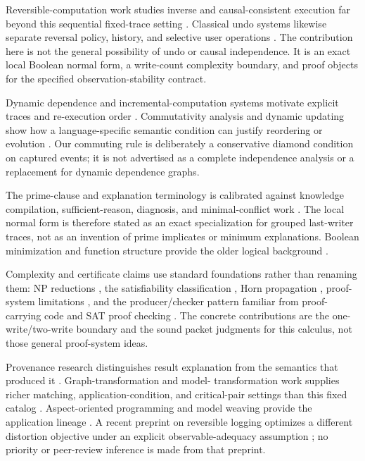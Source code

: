 Reversible-computation work studies inverse and causal-consistent execution far
beyond this sequential fixed-trace setting \cite{Lanese2024,Ulidowski2018,Danos2004,
Phillips2007,Abramsky2005,Landauer1961,Bennett1973}.  Classical undo systems likewise
separate reversal policy, history, and selective user operations
\cite{Archer1984,Leeman1986,Berlage1994,Prakash1994,Abowd1992}.  The contribution here
is not the general possibility of undo or causal independence.  It is an exact local
Boolean normal form, a write-count complexity boundary, and proof objects for the
specified observation-stability contract.

Dynamic dependence and incremental-computation systems motivate explicit traces and
re-execution order \cite{Acar2006,Acar2010,Liu1998,Ferrante1987,Horwitz1990,
Horwitz1989,Ottenstein1984}.  Commutativity analysis and dynamic updating show how a
language-specific semantic condition can justify reordering or evolution
\cite{Rinard1997,Apt2000,Stoyle2007}.  Our commuting rule is deliberately a
conservative diamond condition on captured events; it is not advertised as a
complete independence analysis or a replacement for dynamic dependence graphs.

The prime-clause and explanation terminology is calibrated against knowledge
compilation, sufficient-reason, diagnosis, and minimal-conflict work
\cite{DarwicheMarquis2002,DarwicheHirth2023,DarwicheJi2022,Ignatiev2021,
Reiter1987,Junker2004,Liffiton2008,MarquesSilva2010,Shih2018}.  The local normal form
is therefore stated as an exact specialization for grouped last-writer traces, not as
an invention of prime implicates or minimum explanations.  Boolean minimization and
function structure provide the older logical background
\cite{Birkhoff1937,Quine1952,McCluskey1956,CramaHammer2011}.

Complexity and certificate claims use standard foundations rather than renaming them:
NP reductions \cite{Karp1972,GareyJohnson1979}, the satisfiability classification
\cite{Schaefer1978}, Horn propagation \cite{Dowling1984}, proof-system limitations
\cite{CookReckhow1979,Alekhnovich2001}, and the producer/checker pattern familiar from
proof-carrying code and SAT proof checking \cite{Necula1997,Wetzler2014,Heule2017,
CruzFilipe2017}.  The concrete contributions are the one-write/two-write boundary and
the sound packet judgments for this calculus, not those general proof-system ideas.

Provenance research distinguishes result explanation from the semantics that produced
it \cite{Buneman2001,Green2007,Cheney2009}.  Graph-transformation and model-
transformation work supplies richer matching, application-condition, and critical-pair
settings than this fixed catalog \cite{Ehrig2006,Habel1996,Plump1993,Heckel2002,
Mens2006,Czarnecki2006}.  Aspect-oriented programming and model weaving provide the
application lineage \cite{Kiczales1997,France2004,Morin2010}.  A recent preprint on
reversible logging optimizes a different distortion objective under an explicit
observable-adequacy assumption \cite{Xu2026}; no priority or peer-review inference is
made from that preprint.

